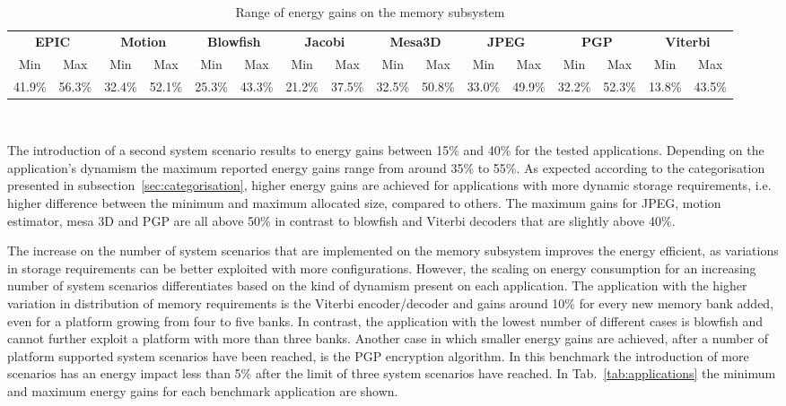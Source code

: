 \documentclass{acm_proc_article-sp}
\begin{document}
\begin{center}
	\begin{table*}[!t]
	\caption{Range of energy gains on the memory subsystem}
	\label{tab:ranges}
	{\small
	\hfill{}
	\begin{tabular}{|c|c|c|c|c|c|c|c|c|c|c|c|c|c|c|c|}
		\hline
		\multicolumn{2}{|c|}{\textbf{EPIC}} &
		\multicolumn{2}{c|}{\textbf{Motion}} &
		\multicolumn{2}{c|}{\textbf{Blowfish}} &
		\multicolumn{2}{c|}{\textbf{Jacobi}} &
		\multicolumn{2}{c|}{\textbf{Mesa3D}} &
		\multicolumn{2}{c|}{\textbf{JPEG}} &
		\multicolumn{2}{c|}{\textbf{PGP}} &
		\multicolumn{2}{c|}{\textbf{Viterbi}} \\ 
		\cline{1-16}
		Min & Max & Min & Max & Min & Max & 
		Min & Max & Min & Max & Min & Max & 
		Min & Max & Min & Max\\ 
		\hline 
		41.9\% & 56.3\% & 32.4\% & 52.1\% & 25.3\% & 43.3\% & 
		21.2\% & 37.5\% & 32.5\% & 50.8\% & 33.0\% & 49.9\% & 
		32.2\% & 52.3\% & 13.8\% & 43.5\% \\ 
		\hline 
	\end{tabular}}
	\hfill{}
	\\
	\end{table*}
\end{center}

The introduction of a second system scenario results to energy gains between 15\% and  40\%  for the tested applications. Depending on the application's dynamism the maximum reported energy gains range from around 35\% to 55\%. As expected according to the categorisation presented in subsection~\ref{sec:categorisation}, higher energy gains are achieved for applications with more dynamic storage requirements, i.e. higher difference between the minimum and maximum allocated size, compared to others. The maximum gains for JPEG, motion estimator, mesa 3D and PGP are all above 50\% in contrast to blowfish and Viterbi decoders that are slightly above 40\%.

The increase on the number of system scenarios that are implemented on the memory subsystem improves the energy efficient, as variations in storage requirements can be better exploited with more configurations. However, the scaling on energy consumption for an increasing number of system scenarios differentiates based on the kind of dynamism present on each application. The application with the higher variation in distribution of memory requirements is the Viterbi encoder/decoder and gains around 10\% for every new memory bank added, even for a platform growing from four to five banks. In contrast, the application with the lowest number of different cases is blowfish and cannot further exploit a platform with more than three banks. Another case in which smaller energy gains are achieved, after a number of platform supported system scenarios have been reached, is the PGP encryption algorithm. In this benchmark the introduction of more scenarios has an energy impact less than 5\% after the limit of three system scenarios have reached. In Tab.~\ref{tab:applications} the minimum and maximum energy gains for each benchmark application are shown.
\end{document}
